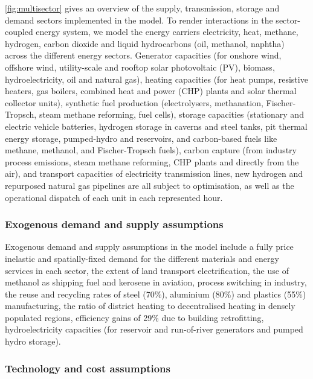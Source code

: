 \cref{fig:multisector} gives an overview of the supply, transmission,
storage and demand sectors implemented in the model. To render interactions in
the sector-coupled energy system, we model the energy carriers electricity,
heat, methane, hydrogen, carbon dioxide and liquid hydrocarbons (oil, methanol,
naphtha) across the different energy sectors. Generator capacities (for onshore
wind, offshore wind, utility-scale and rooftop solar photovoltaic (PV), biomass,
hydroelectricity, oil and natural gas), heating capacities (for heat pumps,
resistive heaters, gas boilers, combined heat and power (CHP) plants and solar
thermal collector units), synthetic fuel production (electrolysers, methanation,
Fischer-Tropsch, steam methane reforming, fuel cells), storage capacities
(stationary and electric vehicle batteries, hydrogen storage in caverns and
steel tanks, pit thermal energy storage, pumped-hydro and reservoirs, and
carbon-based fuels like methane, methanol, and Fischer-Tropsch fuels), carbon
capture (from industry process emissions, steam methane reforming, CHP plants
and directly from the air), and transport capacities of electricity transmission
lines, new hydrogen and repurposed natural gas pipelines are all subject to
optimisation, as well as the operational dispatch of each unit in each
represented hour.

\subsubsection*{Exogenous demand and supply assumptions}

Exogenous demand and supply assumptions in the model include a fully
price inelastic and spatially-fixed demand for the different materials and
energy services in each sector, the extent of land transport electrification,
the use of methanol as shipping fuel and kerosene in aviation, process switching
in industry, the reuse and recycling rates of steel (70\%), aluminium (80\%) and
plastics (55\%) manufacturing, the ratio of district heating to decentralised
heating in densely populated regions, efficiency gains of 29\% due to building
retrofitting, hydroelectricity capacities (for reservoir and run-of-river
generators and pumped hydro storage).

\subsubsection*{Technology and cost assumptions}

